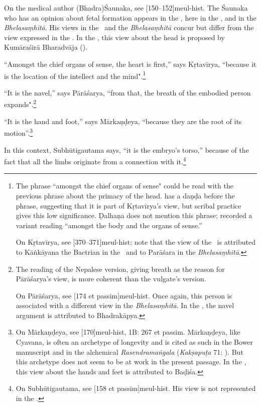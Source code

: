 \begin{translation}
{ On the medical author (Bhadra)Śaunaka, 
see [150--152]{meul-hist}.  The Śaunaka who has an opinion about 
fetal formation appears in the \CS, here in the \SS, and in the 
\emph{Bhelasaṃhitā}.  His views in the \SS\ and the \emph{Bhelasaṃhitā} 
concur but differ from the view expressed in the \CS.  In the \CS, this view about 
the head is proposed by Kumāraśirā Bharadvāja ().}

“Amongst the chief organs of sense, the heart is first,” says
Kṛtavīrya, “because it is the location of the intellect and the
mind".\footnote{The phrase “amongst the chief organs of sense" could
    be read with the previous phrase about the primacy of the head.
     has a daṇḍa before the phrase, suggesting
    that it is part of Kṛtavīrya's view, but scribal practice gives this
    low significance. Ḍalhaṇa does not mention this phrase; \citet[353,
    note 3]{vulgate} recorded a variant reading 
    “amongst the body and the organs of sense.”

On Kṛtavīrya, see [370--371]{meul-hist}; note that the view of the 
\SS\ is attributed to Kāṅkāyana the Bactrian in the \CS\ and to Parāśara in the 
\emph{Bhelasaṃhitā}.}

“It is the navel,” says Pārāśarya, “from that, the breath of the embodied person 
expands".\footnote{The reading of the Nepalese version, giving breath as the 
reason for Pārāśarya's view, is more coherent than the vulgate's version.
    
    On Pārāśarya, see [174 et passim]{meul-hist}.
    Once again, this person is associated with a different view in the 
    \emph{Bhelasaṃhitā}.  In the \CS, the navel argument is attributed to 
    Bhadrakāpya.}
    
“It is the hand and foot,” says Mārkaṇḍeya, “because
they are the root of its motion”.\footnote{On Mārkaṇḍeya, see 
[170]{meul-hist}, 1B: 267 et
passim. Mārkaṇḍeya, like Cyavana, is often an archetype of
longevity and is cited as such in the Bower manuscript
\citep[106--108]{hoer-bowe} and in the alchemical
\emph{Rasendramaṅgala} (\emph{Kakṣapuṭa} 71: ).  But this archetype does not seem to be at work in
the present passage.  In the \CS, this view about the hands and feet is 
attributed to Baḍiśa.}


In this context, Subhūtigautama says, “it is the embryo's torso,”
because of the fact that all the limbs originate from a connection
with it.\footnote{On Subhūtigautama, see [158 et
    passim]{meul-hist}. His view is not represented in the \CS.}
    

\end{translation}
